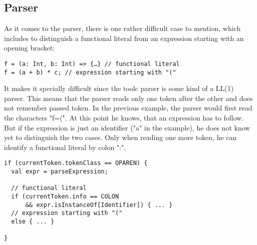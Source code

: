 \subsection{Parser}
As it comes to the parser, there is one rather difficult case to mention, which includes to distinguish a functional literal from an expression starting with an opening bracket:
\begin{lstlisting}
f = (a: Int, b: Int) => {…} // functional literal
f = (a + b) * c; // expression starting with "("
\end{lstlisting}
It makes it specially difficult since the toolc parser is some kind of a LL(1) parser. This means that the parser reads only one token after the other and does not remember passed token. In the previous example, the parser would first read the characters "f=(". At this point he knows, that an expression has to follow. But if the expression is just an identifier ("a" in the example), he does not know yet to distinguish the two cases. Only when reading one more token, he can identify a functional literal by colon ":".
\begin{lstlisting}
if (currentToken.tokenClass == OPAREN) {
  val expr = parseExpression;

  // functional literal
  if (currentToken.info == COLON
      && expr.isInstanceOf[Identifier]) { ... }
  // expression starting with "("
  else { ... }

}
\end{lstlisting}

